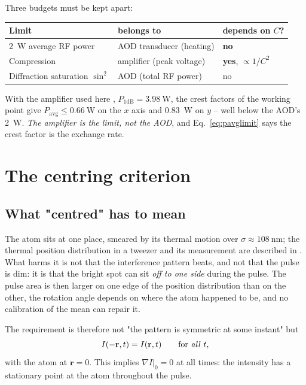 \documentclass[11pt,a4paper]{article}
\newcommand{\crest}{\ensuremath{C}}
\newcommand{\Pavg}{\ensuremath{P_\mathrm{avg}}}
\begin{document}
Three budgets must be kept apart:

\begin{center}
\begin{tabular}{lll}
  \toprule
  Limit & belongs to & depends on \crest?\\
  \midrule
  \SI{2}{\watt} average RF power & AOD transducer (heating) & \textbf{no}\\
  Compression & amplifier (peak voltage) & \textbf{yes}, $\propto1/\crest^2$\\
  Diffraction saturation $\sin^2$ & AOD (total RF power) & no\\
  \bottomrule
\end{tabular}
\end{center}

\noindent With the amplifier used here \cite{minicircuits},
$P_{1\mathrm{dB}} = \SI{3.98}{\watt}$,
the crest factors of the working point give
$\Pavg \le \SI{0.66}{\watt}$ on the $x$ axis and \SI{0.83}{\watt} on $y$ --
well below the AOD's \SI{2}{\watt}. \emph{The amplifier is the limit, not the
AOD}, and Eq.~\eqref{eq:pavglimit} says the crest factor is the exchange rate.

\section{The centring criterion}\label{sec:centring}

\subsection{What "centred" has to mean}

The atom sits at one place, smeared by its thermal motion over
$\sigma\approx\SI{108}{\nano\meter}$; the thermal position distribution in
a tweezer and its measurement are described in \cite{tuchendler2008}. What harms it is not that the
interference pattern beats, and not that the pulse is dim: it is that the
bright spot can sit \emph{off to one side} during the pulse. The pulse area
is then larger on one edge of the position distribution than on the other,
the rotation angle depends on where the atom happened to be, and no
calibration of the mean can repair it.

The requirement is therefore not "the pattern is symmetric at some instant"
but
\begin{equation}
  I(-\mathbf{r},t) = I(\mathbf{r},t) \qquad\text{for \emph{all} } t ,
  \label{eq:centred}
\end{equation}
with the atom at $\mathbf r = 0$. This implies $\nabla I|_{0} = 0$ at all
times: the intensity has a stationary point at the atom throughout the pulse.
\end{document}
